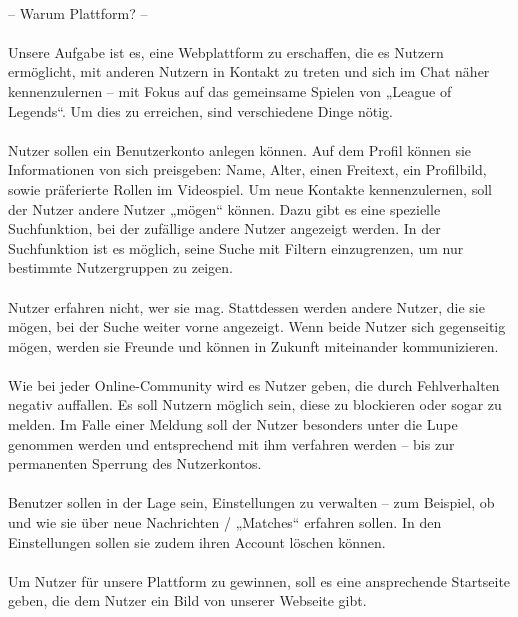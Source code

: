 \paragraph{}
-- Warum Plattform? --

\paragraph{}
Unsere Aufgabe ist es, eine Webplattform zu erschaffen, die es Nutzern ermöglicht, mit anderen Nutzern in Kontakt zu treten und sich im Chat näher kennenzulernen – mit Fokus auf das gemeinsame Spielen von „League of Legends“. Um dies zu erreichen, sind verschiedene Dinge nötig.

\paragraph{}
Nutzer sollen ein Benutzerkonto anlegen können. Auf dem Profil können sie Informationen von sich preisgeben: Name, Alter, einen Freitext, ein Profilbild, sowie präferierte Rollen im Videospiel. Um neue Kontakte kennenzulernen, soll der Nutzer andere Nutzer „mögen“ können. Dazu gibt es eine spezielle Suchfunktion, bei der zufällige andere Nutzer angezeigt werden. In der Suchfunktion ist es möglich, seine Suche mit Filtern einzugrenzen, um nur bestimmte Nutzergruppen zu zeigen.

\paragraph{}
Nutzer erfahren nicht, wer sie mag. Stattdessen werden andere Nutzer, die sie mögen, bei der Suche weiter vorne angezeigt. Wenn beide Nutzer sich gegenseitig mögen, werden sie Freunde und können in Zukunft miteinander kommunizieren.

\paragraph{}
Wie bei jeder Online-Community wird es Nutzer geben, die durch Fehlverhalten negativ auffallen. Es soll Nutzern möglich sein, diese zu blockieren oder sogar zu melden. Im Falle einer Meldung soll der Nutzer besonders unter die Lupe genommen werden und entsprechend mit ihm verfahren werden – bis zur permanenten Sperrung des Nutzerkontos.

\paragraph{}
Benutzer sollen in der Lage sein, Einstellungen zu verwalten – zum Beispiel, ob und wie sie über neue Nachrichten / „Matches“ erfahren sollen. In den Einstellungen sollen sie zudem ihren Account löschen können.

\paragraph{}
Um Nutzer für unsere Plattform zu gewinnen, soll es eine ansprechende Startseite geben, die dem Nutzer ein Bild von unserer Webseite gibt.